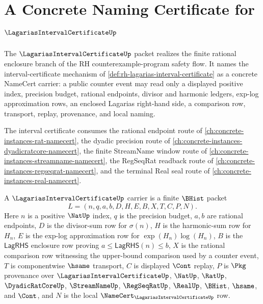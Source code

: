 \chapter{A Concrete Naming Certificate for $\LagariasIntervalCertificateUp$}
\label{ch:concrete-instances-lagarias-interval-certificate-namecert}

The $\LagariasIntervalCertificateUp$ packet realizes the finite rational enclosure branch of the RH counterexample-program safety flow. It names the interval-certificate mechanism of \autoref{def:rh-lagarias-interval-certificate} as a concrete NameCert carrier: a public counter event may read only a displayed positive index, precision budget, rational endpoints, divisor and harmonic ledgers, exp-log approximation rows, an enclosed Lagarias right-hand side, a comparison row, transport, replay, provenance, and local naming.

The interval certificate consumes the rational endpoint route of \autoref{ch:concrete-instances-rat-namecert}, the dyadic precision route of \autoref{ch:concrete-instances-dyadicratcore-namecert}, the finite StreamName window route of \autoref{ch:concrete-instances-streamname-namecert}, the RegSeqRat readback route of \autoref{ch:concrete-instances-regseqrat-namecert}, and the terminal Real seal route of \autoref{ch:concrete-instances-real-namecert}.

\begin{definition}
\label{def:lagarias-interval-certificate-carrier}
A $\LagariasIntervalCertificateUp$ carrier is a finite $\BHist$ packet
$$
L=(n,q,a,b,D,H,E,B,X,T,C,P,N).
$$
Here $n$ is a positive $\NatUp$ index, $q$ is the precision budget, $a,b$ are rational endpoints, $D$ is the divisor-sum row for $\sigma(n)$, $H$ is the harmonic-sum row for $H_n$, $E$ is the exp-log approximation row for $\exp(H_n)\log(H_n)$, $B$ is the $\mathsf{LagRHS}$ enclosure row proving $a\leq \mathsf{LagRHS}(n)\leq b$, $X$ is the rational comparison row witnessing the upper-bound comparison used by a counter event, $T$ is componentwise $\hsame$ transport, $C$ is displayed $\Cont$ replay, $P$ is $\Pkg$ provenance over $\LagariasIntervalCertificateUp$, $\NatUp$, $\RatUp$, $\DyadicRatCoreUp$, $\StreamNameUp$, $\RegSeqRatUp$, $\RealUp$, $\BHist$, $\hsame$, and $\Cont$, and $N$ is the local $\NameCert_{\LagariasIntervalCertificateUp}$ row.
\end{definition}

